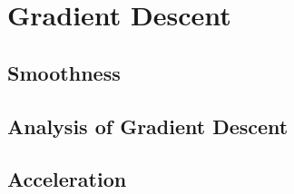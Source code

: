 
\chapter{Gradient Descent}

\section{Smoothness}
\section{Analysis of Gradient Descent}
\section{Acceleration}